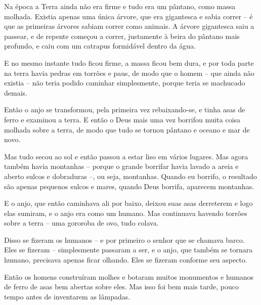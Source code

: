 Na época a Terra ainda não era firme e tudo era um pântano, como massa
molhada. Existia apenas uma única árvore, que era gigantesca e sabia
correr -- é que as primeiras árvores sabiam correr como animais. A
árvore gigantesca saiu a passear, e de repente começou a correr,
justamente à beira do pântano mais profundo, e caiu com um catrapus
formidável dentro da água.

E no mesmo instante tudo ficou firme, a massa ficou bem dura, e por toda
parte na terra havia pedras em torrões e paus, de modo que o homem --
que ainda não existia -- não teria podido caminhar simplesmente, porque
teria se machucado demais.

Então o anjo se transformou, pela primeira vez rebaixando-se, e tinha
asas de ferro e examinou a terra. E então o Deus mais uma vez borrifou
muita coisa molhada sobre a terra, de modo que tudo se tornou pântano e
oceano e mar de novo.

Mas tudo secou ao sol e então passou a estar liso em vários lugares. Mas
agora também havia montanhas -- porque o grande borrifar havia lavado a
areia e aberto sulcos e dobraduras --, ou seja, montanhas. Quando eu
borrifo, o resultado são apenas pequenos sulcos e mares, quando Deus
borrifa, aparecem montanhas.

E o anjo, que então caminhava ali por baixo, deixou suas asas derreterem
e logo elas sumiram, e o anjo era como um humano. Mas continuava
havendo torrões sobre a terra -- uma gororoba de ovo, tudo colava.

Disso se fizeram os humanos -- e por primeiro o senhor que se chamava
barco. Eles se fizeram -- simplesmente passaram a ser, e o anjo, que
também se tornara humano, precisava apenas ficar olhando. Eles se
fizeram conforme seu aspecto.

Então os homens construíram molhes e botaram muitos monumentos e humanos
de ferro de asas bem abertas sobre eles. Mas isso foi bem mais tarde,
pouco tempo antes de inventarem as lâmpadas.


